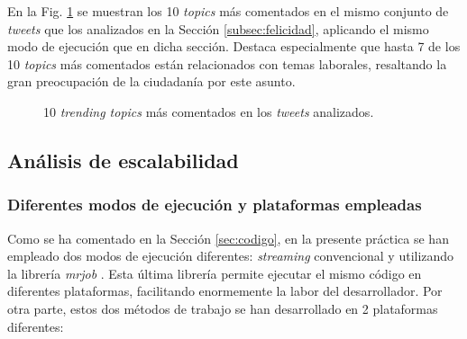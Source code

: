 \documentclass[10pt, spanish]{article}
\begin{document}
En la Fig. \ref{fig:BarTweets} se muestran los 10 \textit{topics} más comentados en el mismo conjunto de \textit{tweets} que los analizados en la Sección \ref{subsec:felicidad}, aplicando el mismo modo de ejecución que en dicha sección. Destaca especialmente que hasta 7 de los 10 \textit{topics} más comentados están relacionados con temas laborales, resaltando la gran preocupación de la ciudadanía por este asunto.

\begin{figure}[H]
\begin{center}
\caption{\label{fig:BarTweets}10 \textit{trending topics} más comentados en los \textit{tweets} analizados.}
\end{center}
\end{figure}


\subsection{Análisis de escalabilidad}
\label{subsec:escalabilidad}

\subsubsection{Diferentes modos de ejecución y plataformas empleadas}
\label{subsubsec:modos_ejecucion_maquinas}

Como se ha comentado en la Sección \ref{sec:codigo}, en la presente práctica se han empleado dos modos de ejecución diferentes: \textit{streaming} convencional y utilizando la librería \textit{mrjob} \cite{mrjob}. Esta última librería permite ejecutar el mismo código en diferentes plataformas, facilitando enormemente la labor del desarrollador. Por otra parte, estos dos métodos de trabajo se han desarrollado en 2 plataformas diferentes:
\end{document}
